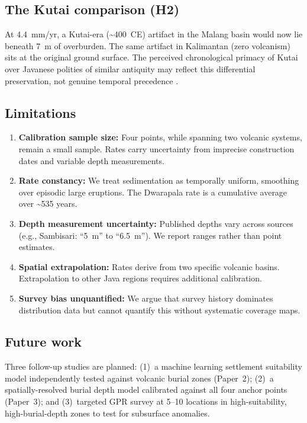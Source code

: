 \documentclass[12pt,a4paper]{article}
\begin{document}
\subsection{The Kutai comparison (H2)}

At 4.4~mm/yr, a Kutai-era (\textasciitilde400~CE) artifact in the Malang basin would now lie beneath 7~m of overburden. The same artifact in Kalimantan (zero volcanism) sits at the original ground surface. The perceived chronological primacy of Kutai over Javanese polities of similar antiquity may reflect this differential preservation, not genuine temporal precedence \citep{coedes1968}.

\subsection{Limitations}

\begin{enumerate}
  \item \textbf{Calibration sample size:} Four points, while spanning two volcanic systems, remain a small sample. Rates carry uncertainty from imprecise construction dates and variable depth measurements.
  \item \textbf{Rate constancy:} We treat sedimentation as temporally uniform, smoothing over episodic large eruptions. The Dwarapala rate is a cumulative average over \textasciitilde535 years.
  \item \textbf{Depth measurement uncertainty:} Published depths vary across sources (e.g., Sambisari: ``5~m'' to ``6.5~m''). We report ranges rather than point estimates.
  \item \textbf{Spatial extrapolation:} Rates derive from two specific volcanic basins. Extrapolation to other Java regions requires additional calibration.
  \item \textbf{Survey bias unquantified:} We argue that survey history dominates distribution data but cannot quantify this without systematic coverage maps.
\end{enumerate}

\subsection{Future work}

Three follow-up studies are planned: (1)~a machine learning settlement suitability model independently tested against volcanic burial zones (Paper~2); (2)~a spatially-resolved burial depth model calibrated against all four anchor points (Paper~3); and (3)~targeted GPR survey at 5--10 locations in high-suitability, high-burial-depth zones to test for subsurface anomalies.
\end{document}
